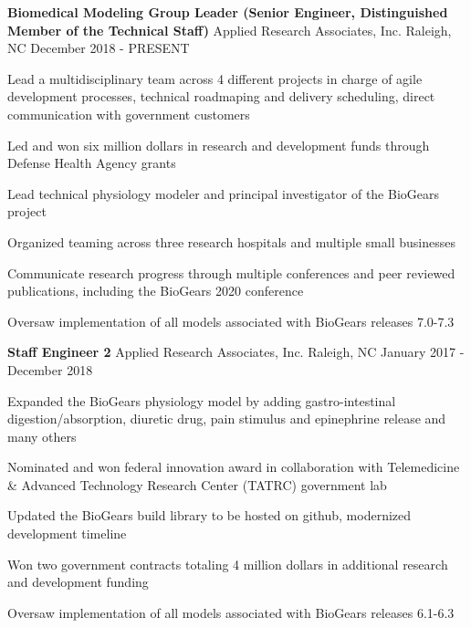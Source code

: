 
\begin{cventries}
  \cventry
    {\textbf{Biomedical Modeling Group Leader (Senior Engineer, Distinguished Member of the Technical Staff)}} %
    {Applied Research Associates, Inc.} %
    {Raleigh, NC} %
    {December 2018 - PRESENT} %
    {
      \begin{cvitems} %
        \item {Lead a multidisciplinary team across 4 different projects in charge of agile development processes, technical roadmaping and delivery scheduling, direct communication with government customers}
        \item {Led and won six million dollars in research and development funds through Defense Health Agency grants}
        \item {Lead technical physiology modeler and principal investigator of the BioGears project}
        \item {Organized teaming across three research hospitals and multiple small businesses}
        \item {Communicate research progress through multiple conferences and peer reviewed publications, including the BioGears 2020 conference}
        \item {Oversaw implementation of all models associated with BioGears releases 7.0-7.3}
      \end{cvitems}
    }

  \cventry
    {\textbf{Staff Engineer 2}} %
    {Applied Research Associates, Inc.} %
    {Raleigh, NC} %
    {January 2017 - December 2018} %
    {
      \begin{cvitems} %
        \item {Expanded the BioGears physiology model by adding gastro-intestinal digestion/absorption, diuretic drug, pain stimulus and epinephrine release and many others}
        \item {Nominated and won federal innovation award in collaboration with Telemedicine \& Advanced Technology Research Center (TATRC) government lab}
        \item {Updated the BioGears build library to be hosted on github, modernized development timeline}
        \item {Won two government contracts totaling 4 million dollars in additional research and development funding}
        \item {Oversaw implementation of all models associated with BioGears releases 6.1-6.3}
      \end{cvitems}
    }


\end{cventries}
